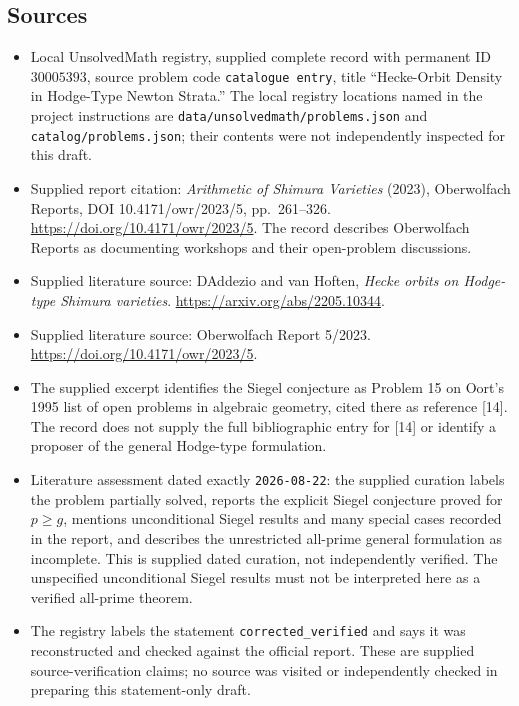 \documentclass[11pt]{article}
\begin{document}
\subsection{Sources}
\begin{itemize}
\item Local UnsolvedMath registry, supplied complete record with permanent ID \(30005393\), source problem code \texttt{catalogue entry}, title ``Hecke-Orbit Density in Hodge-Type Newton Strata.'' The local registry locations named in the project instructions are \texttt{data/unsolvedmath/problems.json} and \texttt{catalog/problems.json}; their contents were not independently inspected for this draft.
\item Supplied report citation: \emph{Arithmetic of Shimura Varieties} (2023), Oberwolfach Reports, DOI 10.4171/owr/2023/5, pp.\ 261--326. \url{https://doi.org/10.4171/owr/2023/5}. The record describes Oberwolfach Reports as documenting workshops and their open-problem discussions.
\item Supplied literature source: DAddezio and van Hoften, \emph{Hecke orbits on Hodge-type Shimura varieties}. \url{https://arxiv.org/abs/2205.10344}.
\item Supplied literature source: Oberwolfach Report 5/2023. \url{https://doi.org/10.4171/owr/2023/5}.
\item The supplied excerpt identifies the Siegel conjecture as Problem 15 on Oort's 1995 list of open problems in algebraic geometry, cited there as reference [14]. The record does not supply the full bibliographic entry for [14] or identify a proposer of the general Hodge-type formulation.
\item Literature assessment dated exactly \texttt{2026-08-22}: the supplied curation labels the problem partially solved, reports the explicit Siegel conjecture proved for \(p\geq g\), mentions unconditional Siegel results and many special cases recorded in the report, and describes the unrestricted all-prime general formulation as incomplete. This is supplied dated curation, not independently verified. The unspecified unconditional Siegel results must not be interpreted here as a verified all-prime theorem.
\item The registry labels the statement \texttt{corrected\_verified} and says it was reconstructed and checked against the official report. These are supplied source-verification claims; no source was visited or independently checked in preparing this statement-only draft.
\end{itemize}
\end{document}
